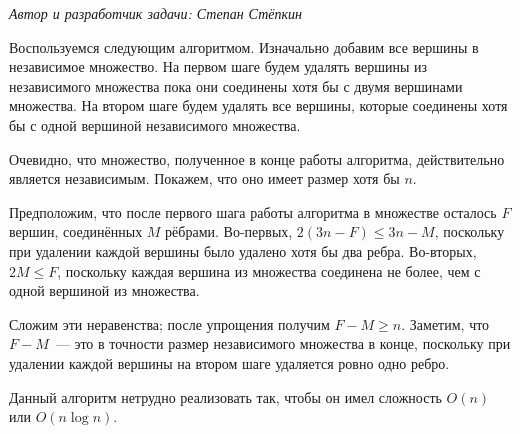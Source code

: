 \textit{Автор и разработчик задачи: Степан Стёпкин}

Воспользуемся следующим алгоритмом. Изначально добавим все вершины в независимое множество. На первом шаге будем удалять вершины из независимого множества пока они соединены хотя бы с двумя вершинами множества. На втором шаге будем удалять все вершины, которые соединены хотя бы с одной вершиной независимого множества.

Очевидно, что множество, полученное в конце работы алгоритма, действительно является независимым. Покажем, что оно имеет размер хотя бы $n$.

Предположим, что после первого шага работы алгоритма в множестве осталось $F$ вершин, соединённых $M$ рёбрами. Во-первых, $2(3n - F) \leq 3n - M$, поскольку при удалении каждой вершины было удалено хотя бы два ребра. Во-вторых, $2M \leq F$, поскольку каждая вершина из множества соединена не более, чем с одной вершиной из множества.

Сложим эти неравенства; после упрощения получим $F - M \geq n$. Заметим, что $F - M$~--- это в точности размер независимого множества в конце, поскольку при удалении каждой вершины на втором шаге удаляется ровно одно ребро.

Данный алгоритм нетрудно реализовать так, чтобы он имел сложность $O(n)$ или $O(n \log n)$.